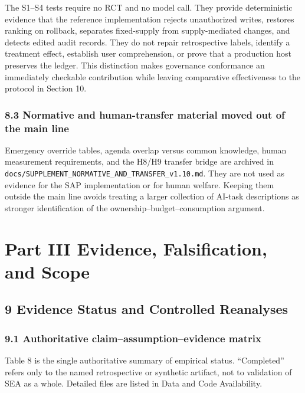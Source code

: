 \documentclass[
  11pt]{article}
\begin{document}
The S1--S4 tests require no RCT and no model call. They provide
deterministic evidence that the reference implementation rejects
unauthorized writes, restores ranking on rollback, separates
fixed-supply from supply-mediated changes, and detects edited audit
records. They do not repair retrospective labels, identify a treatment
effect, establish user comprehension, or prove that a production host
preserves the ledger. This distinction makes governance conformance an
immediately checkable contribution while leaving comparative
effectiveness to the protocol in Section 10.

\subsubsection{8.3 Normative and human-transfer material moved out of
the main
line}\label{normative-and-human-transfer-material-moved-out-of-the-main-line}

Emergency override tables, agenda overlap versus common knowledge, human
measurement requirements, and the H8/H9 transfer bridge are archived in
\texttt{docs/SUPPLEMENT\_NORMATIVE\_AND\_TRANSFER\_v1.10.md}. They are
not used as evidence for the SAP implementation or for human welfare.
Keeping them outside the main line avoids treating a larger collection
of AI-task descriptions as stronger identification of the
ownership--budget--consumption argument.

\section{Part III Evidence, Falsification, and
Scope}\label{part-iii-evidence-falsification-and-scope}

\subsection{9 Evidence Status and Controlled
Reanalyses}\label{evidence-status-and-controlled-reanalyses}

\subsubsection{9.1 Authoritative claim--assumption--evidence
matrix}\label{authoritative-claimassumptionevidence-matrix}

Table 8 is the single authoritative summary of empirical status.
``Completed'' refers only to the named retrospective or synthetic
artifact, not to validation of SEA as a whole. Detailed files are listed
in Data and Code Availability.
\end{document}
